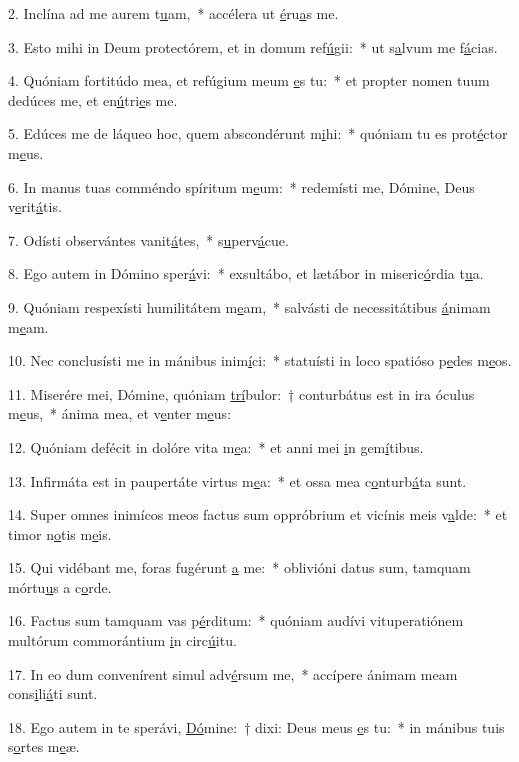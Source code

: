 2. Inclína ad me aurem t\uline{u}am,~* accélera ut \uline{é}ru\uline{a}s me.\par 
3. Esto mihi in Deum protectórem, et in domum ref\uline{ú}gii:~* ut s\uline{a}lvum me f\uline{á}cias.\par 
4. Quóniam fortitúdo mea, et refúgium meum \uline{e}s tu:~* et propter nomen tuum dedúces me, et en\uline{ú}tri\uline{e}s me.\par 
5. Edúces me de láqueo hoc, quem abscondérunt m\uline{i}hi:~* quóniam tu es prot\uline{é}ctor m\uline{e}us.\par 
6. In manus tuas comméndo spíritum m\uline{e}um:~* redemísti me, Dómine, Deus v\uline{e}rit\uline{á}tis.\par 
7. Odísti observántes vanit\uline{á}tes,~* s\uline{u}perv\uline{á}cue.\par 
8. Ego autem in Dómino sper\uline{á}vi:~* exsultábo, et lætábor in miseric\uline{ó}rdia t\uline{u}a.\par 
9. Quóniam respexísti humilitátem m\uline{e}am,~* salvásti de necessitátibus \uline{á}nimam m\uline{e}am.\par 
10. Nec conclusísti me in mánibus inim\uline{í}ci:~* statuísti in loco spatióso p\uline{e}des m\uline{e}os.\par 
11. Miserére mei, Dómine, quóniam \uline{trí}bulor:~† conturbátus est in ira óculus m\uline{e}us,~* ánima mea, et v\uline{e}nter m\uline{e}us:\par 
12. Quóniam defécit in dolóre vita m\uline{e}a:~* et anni mei \uline{i}n gem\uline{í}tibus.\par 
13. Infirmáta est in paupertáte virtus m\uline{e}a:~* et ossa mea c\uline{o}nturb\uline{á}ta sunt.\par 
14. Super omnes inimícos meos factus sum oppróbrium et vicínis meis v\uline{a}lde:~* et timor n\uline{o}tis m\uline{e}is.\par 
15. Qui vidébant me, foras fugérunt \uline{a} me:~* oblivióni datus sum, tamquam mórtu\uline{u}s a c\uline{o}rde.\par 
16. Factus sum tamquam vas p\uline{é}rditum:~* quóniam audívi vituperatiónem multórum commorántium \uline{i}n circ\uline{ú}itu.\par 
17. In eo dum convenírent simul adv\uline{é}rsum me,~* accípere ánimam meam cons\uline{i}li\uline{á}ti sunt.\par 
18. Ego autem in te sperávi, \uline{Dó}mine:~† dixi: Deus meus \uline{e}s tu:~* in mánibus tuis s\uline{o}rtes m\uline{e}æ.\par 
